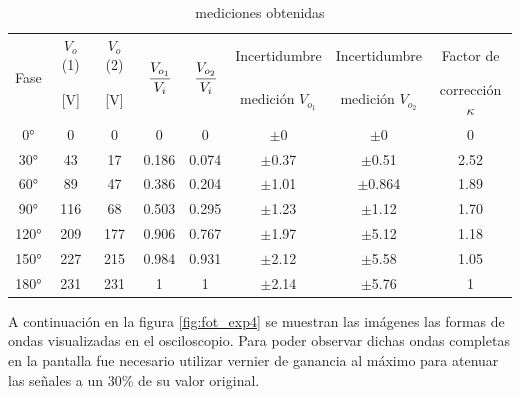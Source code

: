 \begin{table}[H]
    \centering
    \begin{tabular}{|c|c|c|c|c|c|c|c|}
    \hline
        \multirow{2}{*}{Fase} & $V_o$ (1) & $V_o$ (2) & \multirow{2}{*}{$\cfrac{V_{o_1}}{V_i}$} & \multirow{2}{*}{$\cfrac{V_{o_2}}{V_i}$} & Incertidumbre & Incertidumbre&Factor de\\
         & [V] & [V] &  &  & medición $V_{o_1}$ & medición $V_{o_2}$& corrección $\kappa$\\
        \hline
        0° & 0 & 0 & 0 & 0 & $\pm$0 & $\pm$0&0 \\ \hline
        30° & 43 & 17 & 0.186 & 0.074 & $\pm$0.37 & $\pm$0.51& 2.52 \\ \hline
        60° & 89 & 47 & 0.386 & 0.204 & $\pm$1.01 & $\pm$0.864&1.89 \\ \hline
        90° & 116 & 68 & 0.503 & 0.295 & $\pm$1.23 & $\pm$1.12& 1.70\\ \hline
        120° & 209 & 177 & 0.906 & 0.767 & $\pm$1.97 & $\pm$5.12& 1.18\\ \hline
        150° & 227 & 215 & 0.984 & 0.931 & $\pm$2.12 & $\pm$5.58& 1.05\\ \hline
        180° & 231 & 231 & 1 & 1 & $\pm$2.14 & $\pm$5.76& 1\\ \hline
    \end{tabular}
    \def\tablename{Tabla} 
    \caption{mediciones obtenidas}
    \label{tab:exp4}
\end{table}

A continuación en la figura \ref{fig:fot_exp4} se muestran las imágenes las formas de ondas visualizadas en el osciloscopio. Para poder observar dichas ondas completas en la pantalla fue necesario utilizar vernier de ganancia al máximo para atenuar las señales a un 30\% de su valor original.

